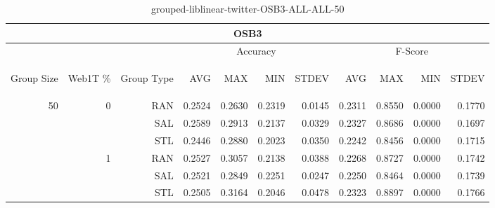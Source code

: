 \begin{center}
\begin{table}[htbp]
\begin{tabular}{ | r | r | r | r | r | r | r | r | r | r | r |}
\hline
\multicolumn{11}{|c|}{OSB3}\\
\hline
 & & & \multicolumn{4}{|c|}{Accuracy} & \multicolumn{4}{|c|}{F-Score}\\ \cline{4-11}
\begin{sideways}Group Size\end{sideways} & \begin{sideways}Web1T \%\end{sideways} & \begin{sideways}Group Type\end{sideways} & \begin{sideways}AVG\end{sideways} & \begin{sideways}MAX\end{sideways} & \begin{sideways}MIN\end{sideways} & \begin{sideways}STDEV\end{sideways} & \begin{sideways}AVG\end{sideways} & \begin{sideways}MAX\end{sideways} & \begin{sideways}MIN\end{sideways} & \begin{sideways}STDEV\end{sideways}\\
\hline
\multirow{6}{*}{50}
 & \multirow{3}{*}{0} & RAN & 0.2524 & 0.2630 & 0.2319 & 0.0145 & 0.2311 & 0.8550 & 0.0000 & 0.1770\\ \cline{3-11}
 &   & SAL & 0.2589 & 0.2913 & 0.2137 & 0.0329 & 0.2327 & 0.8686 & 0.0000 & 0.1697\\ \cline{3-11}
 &   & STL & 0.2446 & 0.2880 & 0.2023 & 0.0350 & 0.2242 & 0.8456 & 0.0000 & 0.1715\\ \cline{2-11}
 & \multirow{3}{*}{1} & RAN & 0.2527 & 0.3057 & 0.2138 & 0.0388 & 0.2268 & 0.8727 & 0.0000 & 0.1742\\ \cline{3-11}
 &   & SAL & 0.2521 & 0.2849 & 0.2251 & 0.0247 & 0.2250 & 0.8464 & 0.0000 & 0.1739\\ \cline{3-11}
 &   & STL & 0.2505 & 0.3164 & 0.2046 & 0.0478 & 0.2323 & 0.8897 & 0.0000 & 0.1766\\ \cline{2-11}
\hline
\end{tabular}
\caption{grouped-liblinear-twitter-OSB3-ALL-ALL-50}
\end{table}
\end{center}


